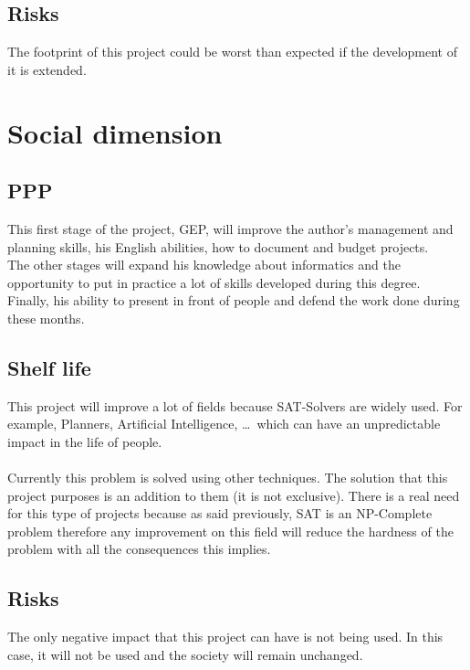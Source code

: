 \subsection{Risks} 
The footprint of this project could be worst than expected if the development of it is extended.

\section{Social dimension}
\subsection{PPP}
This first stage of the project, GEP, will improve the author's management and planning skills, his English abilities, how to document and budget projects.\\
The other stages will expand his knowledge about informatics and the opportunity to put in practice a lot of skills developed during this degree. \\
Finally, his ability to present in front of people and defend the work done during these months.

\subsection{Shelf life}
This project will improve a lot of fields because SAT-Solvers are widely used. For example, Planners, Artificial Intelligence, \ldots \ which can have an unpredictable impact in the life of people.\\\\
Currently this problem is solved using other techniques. The solution that this project purposes is an addition to them (it is not exclusive). There is a real need for this type of projects because as said previously, SAT is an NP-Complete problem therefore any improvement on this field will reduce the hardness of the problem with all the consequences this implies.
\subsection{Risks}
The only negative impact that this project can have is not being used. In this case, it will not be used and the society will remain unchanged.

